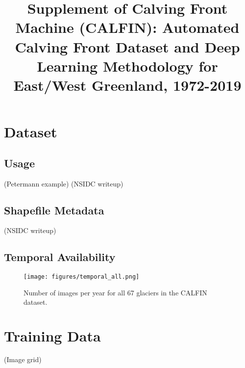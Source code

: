 \documentclass[tc,manuscript]{copernicus}
\begin{document}
\title{Supplement of Calving Front Machine (CALFIN): Automated Calving Front Dataset and Deep Learning Methodology for East/West Greenland, 1972-2019}







\received{}
\pubdiscuss{} %
\revised{}
\accepted{}
\published{}

\maketitle



\section{Dataset}
\subsection{Usage}
(Petermann example)
(NSIDC writeup)
\subsection{Shapefile Metadata}
(NSIDC writeup)


\begin{landscape}
    \subsection{Temporal Availability}
    \begin{figure}[h]
        \centering
        \texttt{[image: figures/temporal\_all.png]}
        \caption{Number of images per year for all 67 glaciers in the CALFIN dataset.}
        \label{fig:temporal_all}
    \end{figure}
\end{landscape}


\section{Training Data}
(Image grid)
\end{document}
